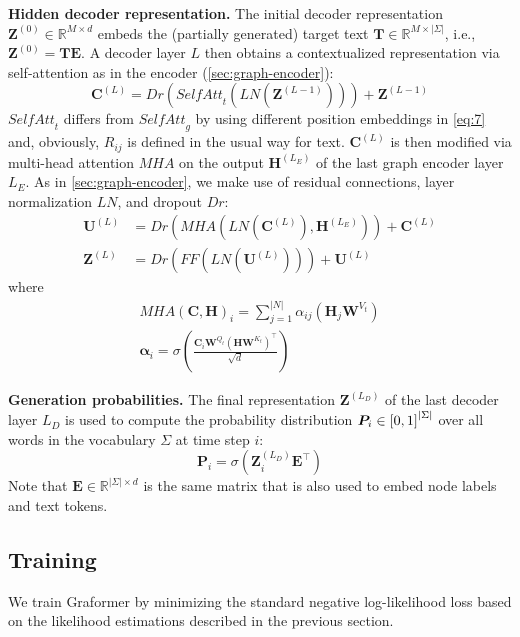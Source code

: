 \documentclass[11pt]{article}
\newcommand{\para}[1]{\noindent\textbf{#1.}}
\newcommand{\abs}[1]{\left|#1\right|}
\newcommand{\R}{\mathbb{R}}
\newcommand{\E}{L_E}  \newcommand{\D}{L_D}  \newcommand{\relset}{\mathcal{R}}
\newcommand{\softmax}[1]{\sigma\left(#1\right)}
\newcommand{\mat}{\bm}  \let\oldvec\vec
\renewcommand{\vec}{\bm}
\begin{document}
\para{Hidden decoder representation}
The initial decoder representation $\mat{Z}^{(0)} \in\R^{M\times d}$ embeds the (partially generated) target text $\mat{T}\in\R^{M\times\abs{\Sigma}}$,
i.e., $\mat{Z}^{(0)} = \mat{T} \mat{E}$.
A decoder layer $L$ then obtains a contextualized representation via self-attention as in the encoder (\cref{sec:graph-encoder}):
\begin{equation}
	\mat{C}^{(L)} = \mathit{Dr}(\mathit{SelfAtt}_t(\mathit{LN}(\mat{Z}^{(L-1)}))) + \mat{Z}^{(L-1)}
\end{equation}
$\mathit{SelfAtt}_t$ differs from $\mathit{SelfAtt}_g$ by using different position embeddings in \cref{eq:7}
and, obviously, $R_{ij}$ is defined in the usual way for text.
$\mat{C}^{(L)}$ is then modified via multi-head attention $\mathit{MHA}$ on the output $\mat{H}^{(\E)}$ of the last graph encoder layer $\E$.
As in \cref{sec:graph-encoder},
we make use of residual connections, layer normalization $\mathit{LN}$, and dropout $\mathit{Dr}$:
\begin{align}
	\mat{U}^{(L)} &= \mathit{Dr}(\mathit{MHA}(\mathit{LN}(\mat{C}^{(L)}), \mat{H}^{(\E)})) + \mat{C}^{(L)} \\
	\mat{Z}^{(L)} &= \mathit{Dr}(\mathit{FF}(\mathit{LN}(\mat{U}^{(L)}))) + \mat{U}^{(L)}
\end{align}
where
\begin{align}
	\label{eq:mhatt}
	\mathit{MHA}(\mat{C}, \mat{H})_i = \sum_{j=1}^{\abs{N}} \alpha_{ij} (\vec{H}_j \mat{W}^{V_t})\\
	\label{eq:mhattalpha}
	\vec{\alpha}_{i} = \softmax{\frac{\vec{C}_i\mat{W}^{Q_t} (\vec{H}\mat{W}^{K_t})^\top}{\sqrt{d}}}
\end{align}


\para{Generation probabilities}
\label{sec:probabilities}
The final representation $\mat{Z}^{(\D)}$ of the last decoder layer $\D$ is used
to compute 
the probability distribution $\vec{P}_{i}\in\interval{0}{1}^{\abs{\Sigma}}$ over all words in the vocabulary $\Sigma$ at time step $i$:
\begin{equation}
	\label{eq:14}
\vec{P}_i = \softmax{\vec{Z}_i^{(\D)} \mat{E}^\top}
\end{equation}
Note that
$\mat{E}\in \R^{\abs{\Sigma}\times d}$ 
is the same matrix
that is also used to embed node labels and text tokens.

\subsection{Training}
We train Graformer by minimizing the standard negative log-likelihood loss
based on the likelihood estimations described in the previous section. 
\end{document}

